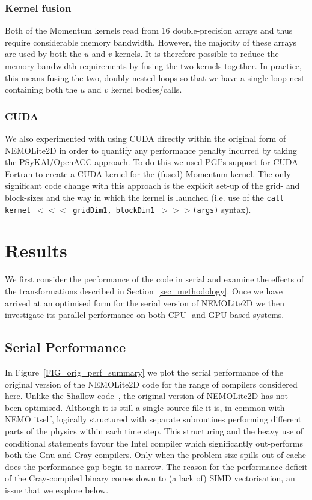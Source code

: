 \documentclass[gmdd, manuscript]{copernicus}
\begin{document}
\subsubsection{Kernel fusion}

Both of the Momentum kernels read from 16 double-precision arrays and
thus require considerable memory bandwidth.  However, the majority of
these arrays are used by both the $u$ and $v$ kernels. It is therefore
possible to reduce the memory-bandwidth requirements by fusing the two
kernels together. In practice, this means fusing the two,
doubly-nested loops so that we have a single loop nest containing both
the $u$ and $v$ kernel bodies/calls.

\subsubsection{CUDA}

We also experimented with using CUDA directly within the original form
of NEMOLite2D in order to quantify any performance penalty incurred by
taking the {PS}y{KA}l/OpenACC approach. To do this we used PGI's
support for CUDA Fortran to create a CUDA kernel for the (fused)
Momentum kernel. The only significant code change with this approach
is the explicit set-up of the grid- and block-sizes and the way in
which the kernel is launched (i.e. use of the \texttt{call kernel $<<<$
  gridDim1, blockDim1 $>>>$(args)} syntax).

\section{Results}

We first consider the performance of the code in serial and examine
the effects of the transformations described in
Section~\ref{sec_methodology}. Once we have arrived at an optimised
form for the serial version of NEMOLite2D we then investigate its
parallel performance on both CPU- and GPU-based systems.

\subsection{Serial Performance}

In Figure~\ref{FIG_orig_perf_summary} we plot the serial performance
of the original version of the NEMOLite2D code for the range of
compilers considered here. Unlike the Shallow
code~\citep{shallow_psykal}, the original version of NEMOLite2D has not
been optimised. Although it is still a single source file it is, in
common with NEMO itself, logically structured with separate
subroutines performing different parts of the physics within each time
step. This structuring and the heavy use of conditional statements
favour the Intel compiler which significantly out-performs both the
Gnu and Cray compilers. Only when the problem size spills out of cache
does the performance gap begin to narrow. The reason for the
performance deficit of the Cray-compiled binary comes down to (a lack
of) SIMD vectorisation, an issue that we explore below.
\end{document}
